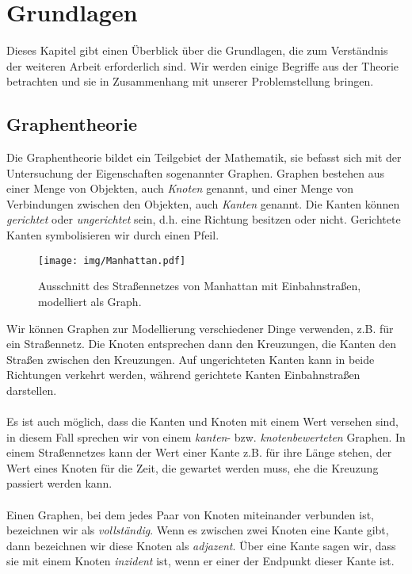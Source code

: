 \chapter{Grundlagen}
Dieses Kapitel gibt einen Überblick über die Grundlagen, die zum Verständnis der weiteren Arbeit erforderlich sind. Wir werden einige Begriffe aus der Theorie betrachten und sie in Zusammenhang mit unserer Problemstellung bringen.


\section{Graphentheorie}\label{chp:graph}
Die Graphentheorie bildet ein Teilgebiet der Mathematik, sie befasst sich mit der Untersuchung der Eigenschaften sogenannter Graphen. Graphen bestehen aus einer Menge von Objekten, auch \emph{Knoten} genannt, und einer Menge von Verbindungen zwischen den Objekten, auch \emph{Kanten} genannt. Die Kanten können \emph{gerichtet} oder \emph{ungerichtet} sein, d.h. eine Richtung besitzen oder nicht. Gerichtete Kanten symbolisieren wir durch einen Pfeil. \\

\begin{wrapfigure}{r}{0.4\textwidth}
  \vspace{-20pt}
  \begin{center}
    \texttt{[image: img/Manhattan.pdf]}
  \end{center}
  \vspace{-20pt}
  \caption[Beispiel: Graph]{Ausschnitt des Straßennetzes von Manhattan mit Einbahnstraßen, modelliert als Graph.}
  \vspace{-10pt}
  \label{fig:manhattan}
\end{wrapfigure}

\noindent
Wir können Graphen zur Modellierung verschiedener Dinge verwenden, z.B. für ein Straßennetz. Die Knoten entsprechen dann den Kreuzungen, die Kanten den Straßen zwischen den Kreuzungen. Auf ungerichteten Kanten kann in beide Richtungen verkehrt werden, während gerichtete Kanten Einbahnstraßen darstellen. \\
\\
Es ist auch möglich, dass die Kanten und Knoten mit einem Wert versehen sind, in diesem Fall sprechen wir von einem \emph{kanten}- bzw. \emph{knotenbewerteten} Graphen. In einem Straßennetzes kann der Wert einer Kante z.B. für ihre Länge stehen, der Wert eines Knoten für die Zeit, die gewartet werden muss, ehe die Kreuzung passiert werden kann. \\
\\
Einen Graphen, bei dem jedes Paar von Knoten miteinander verbunden ist, bezeichnen wir als \emph{vollständig}. Wenn es zwischen zwei Knoten eine Kante gibt, dann bezeichnen wir diese Knoten als \emph{adjazent}. Über eine Kante sagen wir, dass sie mit einem Knoten \emph{inzident} ist, wenn er einer der Endpunkt dieser Kante ist.

